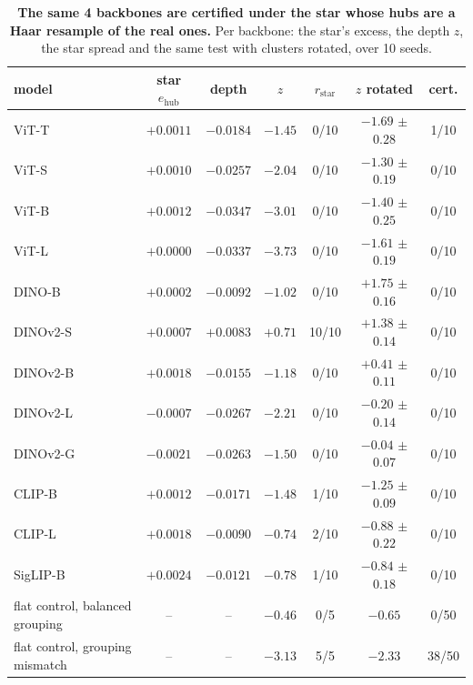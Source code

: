\begin{table}[H]
\centering
\scriptsize
\setlength{\tabcolsep}{2.2pt}
\begingroup
\setlength{\tabcolsep}{4pt}
\begin{tabular}{lcccccc}
\toprule
model & star $e_{\mathrm{hub}}$ & depth & $z$ & $r_{\text{star}}$ & $z$ rotated & cert. \\
\midrule
ViT-T & $+0.0011$ & $-0.0184$ & $-1.45$ & 0/10 & $-1.69$ $\pm$ $0.28$ & 1/10 \\
ViT-S & $+0.0010$ & $-0.0257$ & $-2.04$ & 0/10 & $-1.30$ $\pm$ $0.19$ & 0/10 \\
ViT-B & $+0.0012$ & $-0.0347$ & $-3.01$ & 0/10 & $-1.40$ $\pm$ $0.25$ & 0/10 \\
ViT-L & $+0.0000$ & $-0.0337$ & $-3.73$ & 0/10 & $-1.61$ $\pm$ $0.19$ & 0/10 \\
\midrule
DINO-B & $+0.0002$ & $-0.0092$ & $-1.02$ & 0/10 & $+1.75$ $\pm$ $0.16$ & 0/10 \\
DINOv2-S & $+0.0007$ & $+0.0083$ & $+0.71$ & 10/10 & $+1.38$ $\pm$ $0.14$ & 0/10 \\
DINOv2-B & $+0.0018$ & $-0.0155$ & $-1.18$ & 0/10 & $+0.41$ $\pm$ $0.11$ & 0/10 \\
DINOv2-L & $-0.0007$ & $-0.0267$ & $-2.21$ & 0/10 & $-0.20$ $\pm$ $0.14$ & 0/10 \\
DINOv2-G & $-0.0021$ & $-0.0263$ & $-1.50$ & 0/10 & $-0.04$ $\pm$ $0.07$ & 0/10 \\
\midrule
CLIP-B & $+0.0012$ & $-0.0171$ & $-1.48$ & 1/10 & $-1.25$ $\pm$ $0.09$ & 0/10 \\
CLIP-L & $+0.0018$ & $-0.0090$ & $-0.74$ & 2/10 & $-0.88$ $\pm$ $0.22$ & 0/10 \\
SigLIP-B & $+0.0024$ & $-0.0121$ & $-0.78$ & 1/10 & $-0.84$ $\pm$ $0.18$ & 0/10 \\
flat control, balanced grouping & -- & -- & $-0.46$ & 0/5 & $-0.65$ & 0/50 \\
flat control, grouping mismatch & -- & -- & $-3.13$ & 5/5 & $-2.33$ & 38/50 \\
\bottomrule
\end{tabular}
\par\vspace{2pt}
\endgroup
\caption{\textbf{The same 4 backbones are certified under the star whose hubs are a Haar resample of the real ones.} Per backbone: the star's excess, the depth $z$, the star spread and the same test with clusters rotated, over 10 seeds.
}
\label{tab:q4-depth-ap}
\end{table}
